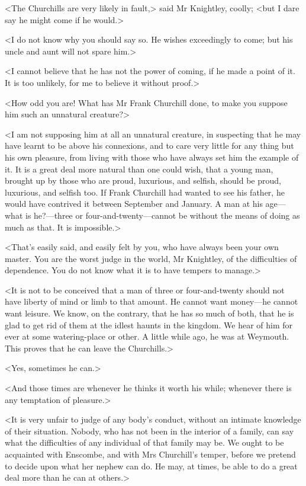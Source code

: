 <The Churchills are very likely in fault,> said Mr Knightley, coolly; <but I dare say he might come if he would.>

<I do not know why you should say so. He wishes exceedingly to come; but his uncle and aunt will not spare him.>

<I cannot believe that he has not the power of coming, if he made a point of it. It is too unlikely, for me to believe it without proof.>

<How odd you are! What has Mr Frank Churchill done, to make you suppose him such an unnatural creature?>

<I am not supposing him at all an unnatural creature, in suspecting that he may have learnt to be above his connexions, and to care very little for any thing but his own pleasure, from living with those who have always set him the example of it. It is a great deal more natural than one could wish, that a young man, brought up by those who are proud, luxurious, and selfish, should be proud, luxurious, and selfish too. If Frank Churchill had wanted to see his father, he would have contrived it between September and January. A man at his age—what is he?—three or four-and-twenty—cannot be without the means of doing as much as that. It is impossible.>

<That's easily said, and easily felt by you, who have always been your own master. You are the worst judge in the world, Mr Knightley, of the difficulties of dependence. You do not know what it is to have tempers to manage.>

<It is not to be conceived that a man of three or four-and-twenty should not have liberty of mind or limb to that amount. He cannot want money—he cannot want leisure. We know, on the contrary, that he has so much of both, that he is glad to get rid of them at the idlest haunts in the kingdom. We hear of him for ever at some watering-place or other. A little while ago, he was at Weymouth. This proves that he can leave the Churchills.>

<Yes, sometimes he can.>

<And those times are whenever he thinks it worth his while; whenever there is any temptation of pleasure.>

<It is very unfair to judge of any body's conduct, without an intimate knowledge of their situation. Nobody, who has not been in the interior of a family, can say what the difficulties of any individual of that family may be. We ought to be acquainted with Enscombe, and with Mrs Churchill's temper, before we pretend to decide upon what her nephew can do. He may, at times, be able to do a great deal more than he can at others.>

